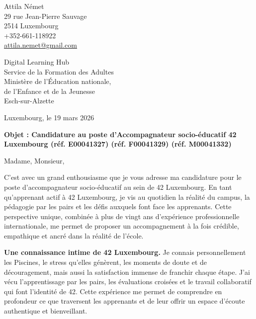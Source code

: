 \documentclass[a4paper,11pt]{article}
\begin{document}
\begin{flushright}
Attila Német\\
29 rue Jean-Pierre Sauvage\\
2514 Luxembourg\\
+352-661-118922\\
\href{mailto:attila.nemet@gmail.com}{attila.nemet@gmail.com}
\end{flushright}

\vspace{1cm}

\begin{flushleft}
Digital Learning Hub\\
Service de la Formation des Adultes\\
Ministère de l'Éducation nationale,\\
de l'Enfance et de la Jeunesse\\
Esch-sur-Alzette
\end{flushleft}

\vspace{0.5cm}

\begin{flushright}
Luxembourg, le 19 mars 2026
\end{flushright}

\vspace{0.5cm}

\noindent\textbf{Objet : Candidature au poste d'Accompagnateur socio-éducatif 42 Luxembourg (réf. E00041327) (réf. F00041329) (réf. M00041332)}

\vspace{0.5cm}

\noindent Madame, Monsieur,

\vspace{0.3cm}

\noindent C'est avec un grand enthousiasme que je vous adresse ma candidature pour le poste d'accompagnateur socio-éducatif au sein de 42 Luxembourg. En tant qu'apprenant actif à 42 Luxembourg, je vis au quotidien la réalité du campus, la pédagogie par les pairs et les défis auxquels font face les apprenants. Cette perspective unique, combinée à plus de vingt ans d'expérience professionnelle internationale, me permet de proposer un accompagnement à la fois crédible, empathique et ancré dans la réalité de l'école.

\vspace{0.3cm}

\noindent \textbf{Une connaissance intime de 42 Luxembourg.} Je connais personnellement les Piscines, le stress qu'elles génèrent, les moments de doute et de découragement, mais aussi la satisfaction immense de franchir chaque étape. J'ai vécu l'apprentissage par les pairs, les évaluations croisées et le travail collaboratif qui font l'identité de 42. Cette expérience me permet de comprendre en profondeur ce que traversent les apprenants et de leur offrir un espace d'écoute authentique et bienveillant.
\end{document}
